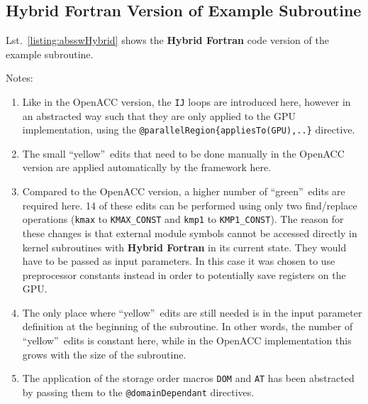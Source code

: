 \subsection{Hybrid Fortran Version of Example Subroutine}

Lst.~\ref{listing:absswHybrid} shows the \textbf{Hybrid Fortran} code version of the example subroutine. 

Notes: 
\begin{enumerate}
 \item Like in the OpenACC version, the \verb|IJ| loops are introduced here, however in an abstracted way such that they are only applied to the GPU implementation, using the \verb|@parallelRegion{appliesTo(GPU),..}| directive.
 \item The small \textquotedblleft yellow\textquotedblright\ edits that need to be done manually in the OpenACC version are applied automatically by the framework here. 
 \item Compared to the OpenACC version, a higher number of \textquotedblleft green\textquotedblright\ edits are required here. 14 of these edits can be performed using only two find/replace operations (\verb|kmax| to \verb|KMAX_CONST| and \verb|kmp1| to \verb|KMP1_CONST|). The reason for these changes is that external module symbols cannot be accessed directly in kernel subroutines with \textbf{Hybrid Fortran} in its current state. They would have to be passed as input parameters. In this case it was chosen to use preprocessor constants instead in order to potentially save registers on the GPU. 
 \item The only place where \textquotedblleft yellow\textquotedblright\ edits are still needed is in the input parameter definition at the beginning of the subroutine. In other words, the number of \textquotedblleft yellow\textquotedblright\ edits is constant here, while in the OpenACC implementation this grows with the size of the subroutine.
 \item The application of the storage order macros \verb|DOM| and \verb|AT| has been abstracted by passing them to the \verb|@domainDependant| directives.
\end{enumerate}

